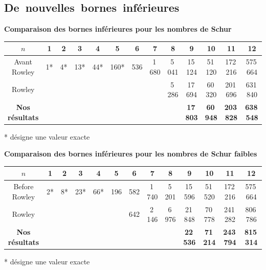 \documentclass[graphics]{beamer}
\begin{document}
\subsection{De~nouvelles~bornes~inférieures}

\begin{frame}
	\begin{center}
		\small
		\textbf{Comparaison des bornes inférieures pour les nombres de Schur}

		\vspace{2ex}
		\footnotesize
		\setlength{\tabcolsep}{2pt}
		\renewcommand{\arraystretch}{1.6}

		\begin{tabular}{|*{13}{c|}}
		    \hline
		    \(n\) & 1 & 2 & 3 & 4 & 5 & 6 & 7 & 8 & 9 & 10 & 11 & 12 \\
		    \hline
		    Avant Rowley & 1* & 4* & 13* & 44* & 160* & 536 & 1\,680 & 5\,041 & 15\,124 & 51\,120 & 172\,216 & 575\,664 \\
		    \hline
		    Rowley & & & & & & & & 5\,286 & 17\,694 & 60\,320 & 201\,696 & 631\,840 \\
		    \hline
		    \textbf{Nos résultats} & & & & & & & & & \textbf{17\,803} & \textbf{60\,948} & \textbf{203\,828} & \textbf{638\,548} \\
		    \hline
		\end{tabular}
		
		\vspace{2ex}
		* désigne une valeur exacte
	\end{center}
\end{frame}

\begin{frame}
	\begin{center}
		\small	
		\textbf{Comparaison des bornes inférieures pour les nombres de Schur faibles}

		\vspace{2ex}
		\footnotesize
		\setlength{\tabcolsep}{1.8pt}
		\renewcommand{\arraystretch}{1.6}
		
		\begin{tabular}{|*{13}{c|}}
		    \hline
		    \(n\) & 1 & 2 & 3 & 4 & 5 & 6 & 7 & 8 & 9 & 10 & 11 & 12 \\
		    \hline
		    Before Rowley & 2* & 8* & 23* & 66* & 196 & 582 & 1\,740 & 5\,201 & 15\,596 & 51\,520 & 172\,216 & 575\,664 \\
		    \hline
		    Rowley & & & & & & 642 & 2\,146 & 6\,976 & 21\,848 & 70\,778 & 241\,282 & 806\,786 \\
		    \hline
		    \textbf{Nos résultats} & & & & & & & & & \textbf{22\,536} & \textbf{71\,214} & \textbf{243\,794} & \textbf{815\,314} \\
		    \hline
		\end{tabular}
		
		\vspace{2ex}
		* désigne une valeur exacte
	\end{center}
\end{frame}
\end{document}
